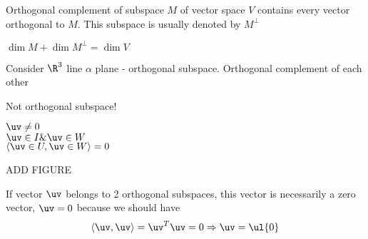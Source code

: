 \begin{definition}
Orthogonal complement of subspace $M$ of vector space $V$ contains every vector orthogonal to $M$. This subspace is usually denoted by $M^\perp$
\end{definition}

\begin{remark}
$\dim M+\dim M^\perp = \dim V$	
\end{remark}
\begin{example}
Consider $\R^3$
line $\alpha$ plane	- orthogonal subspace. Orthogonal complement of each other
\end{example}
\begin{example}
Not orthogonal subspace!\\
\begin{minipage}[t]{0.45\linewidth}
$\uv\not=0$\\
$\uv\in I \& \uv\in W$\\
$\langle \uv\in U,\uv\in W\rangle=0$
\end{minipage}
\begin{minipage}[t]{0.45\linewidth}
ADD FIGURE	
\end{minipage}
\end{example}

\begin{note}
If vector $\uv$ belongs to 2 orthogonal subspaces, this vector is necessarily a zero vector, $\uv = 0$ because we should have 
\[
\langle\uv,\uv\rangle = \uv^T\uv = 0\Rightarrow \uv = \ul{0}
\]
\end{note}

























